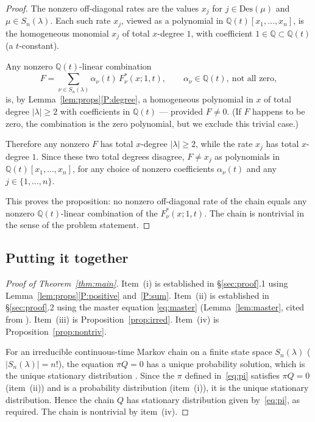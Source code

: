 \documentclass[12pt]{article}
\theoremstyle{definition}
\begin{document}
\begin{proof}
The nonzero off-diagonal rates are the values $x_j$ for $j\in
\mathrm{Des}(\mu)$ and $\mu\in S_n(\lambda)$. Each such rate $x_j$,
viewed as a polynomial in $\mathbb{Q}(t)[x_1,\dots,x_n]$, is the
homogeneous monomial $x_j$ of total $x$-degree $1$, with coefficient
$1\in\mathbb{Q}\subset\mathbb{Q}(t)$ (a $t$-constant).

Any nonzero $\mathbb{Q}(t)$-linear combination
\[
F=\sum_{\nu\in S_n(\lambda)}\alpha_\nu(t)\,F^*_\nu(x;1,t),\qquad
\alpha_\nu\in\mathbb{Q}(t),\ \text{not all zero},
\]
is, by Lemma~\ref{lem:props}\ref{P:degree}, a homogeneous polynomial in
$x$ of total degree $|\lambda|\ge 2$ with coefficients in
$\mathbb{Q}(t)$ — provided $F\neq 0$. (If $F$ happens to be zero, the
combination is the zero polynomial, but we exclude this trivial case.)

Therefore any nonzero $F$ has total $x$-degree $|\lambda|\ge 2$, while
the rate $x_j$ has total $x$-degree $1$. Since these two total degrees
disagree, $F\neq x_j$ as polynomials in $\mathbb{Q}(t)[x_1,\dots,x_n]$,
for any choice of nonzero coefficients $\alpha_\nu(t)$ and any
$j\in\{1,\dots,n\}$.

This proves the proposition: no nonzero off-diagonal rate of the chain
equals any nonzero $\mathbb{Q}(t)$-linear combination of the
$F^*_\nu(x;1,t)$. The chain is nontrivial in the sense of the problem
statement.
\end{proof}

\subsection{Putting it together}

\begin{proof}[Proof of Theorem~\ref{thm:main}]
Item~(i) is established in §\ref{sec:proof}.1 using
Lemma~\ref{lem:props}\ref{P:positive} and~\ref{P:sum}. Item~(ii) is
established in §\ref{sec:proof}.2 using the master equation
\eqref{eq:master} (Lemma~\ref{lem:master}, cited from
\cite[Theorem~5.4]{CMW}). Item~(iii) is Proposition~\ref{prop:irred}.
Item~(iv) is Proposition~\ref{prop:nontriv}.

For an irreducible continuous-time Markov chain on a finite state space
$S_n(\lambda)$ ($|S_n(\lambda)|=n!$), the equation $\pi Q=0$ has a
unique probability solution, which is the unique stationary distribution
\cite[Theorem~3.5.5]{Norris}. Since the $\pi$ defined in~\eqref{eq:pi}
satisfies $\pi Q=0$ (item~(ii)) and is a probability distribution
(item~(i)), it is the unique stationary distribution. Hence the chain
$Q$ has stationary distribution given by~\eqref{eq:pi}, as required.
The chain is nontrivial by item~(iv).
\end{proof}
\end{document}

